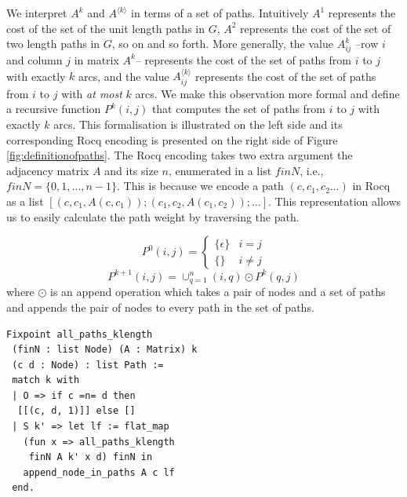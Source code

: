 \documentclass[a4paper,UKenglish,cleveref, autoref, thm-restate, anonymous]{lipics-v2021}
\begin{document}
We interpret $A^k$ and $A^{\langle k \rangle}$ in terms of 
a set of paths.
Intuitively $A^{1}$ represents the cost 
of the set of the unit length paths in $G$, $A^{2}$ represents 
the cost of the set of two length paths in $G$, so on and so forth. 
More generally, the value $A^{k}_{ij}$ --row $i$ and column $j$ in matrix $A^{k}$-- 
represents the cost of the set of paths from $i$ to $j$ with exactly $k$ arcs,
and the value $A^{\langle k \rangle}_{ij}$ represents the cost of the set of paths 
from $i$ to $j$ with \textit{at most} $k$ arcs. 
We make this observation more formal and define a recursive function $P^{k}(i, j)$
that computes the set of paths from $i$ to $j$ with exactly $k$ arcs.
This formalisation is illustrated on the left side and its corresponding Rocq encoding is presented on 
the right side of Figure \ref{fig:definitionofpaths}. 
The Rocq encoding takes two 
extra argument the adjacency matrix $A$ and its size $n$, 
enumerated in a list $finN$, i.e., $finN = \{0, 1, \dots, n-1\}$. 
This is because we encode a path $(c, c_1, c_2 \dots )$ in Rocq as a list 
$[(c, c_1, A(c, c_1)); (c_1, c_2, A(c_1, c_2)); \dots ]$.
This representation allows us to easily calculate the path weight by traversing the path. 


\begin{center}
\begin{minipage}[t]{0.45\textwidth}

 \[
P^{0}(i, j) = 
\begin{cases}
    {\{\epsilon\}} & i = j \\
    \{\} & i \neq j 
\end{cases}
\]
\[
P^{k+1}(i, j) = \cup_{q = 1}^{n} (i, q) \odot P^{k}(q, j)
\] where $\odot$ is an append operation which takes a pair of nodes and 
a set of paths and appends the pair of nodes to 
every path in the set of paths. 
\end{minipage}
\hfill
\begin{minipage}[t]{0.48\textwidth}{\vspace{-2mm}}
 \begin{lstlisting}[language=Coq]
Fixpoint all_paths_klength 
 (finN : list Node) (A : Matrix) k 
 (c d : Node) : list Path :=
 match k with
 | O => if c =n= d then 
  [[(c, d, 1)]] else []
 | S k' => let lf := flat_map 
   (fun x => all_paths_klength 
    finN A k' x d) finN in 
   append_node_in_paths A c lf
 end.
    \end{lstlisting}
\end{minipage}

\label{fig:definitionofpaths}
\end{center}
\end{document}
